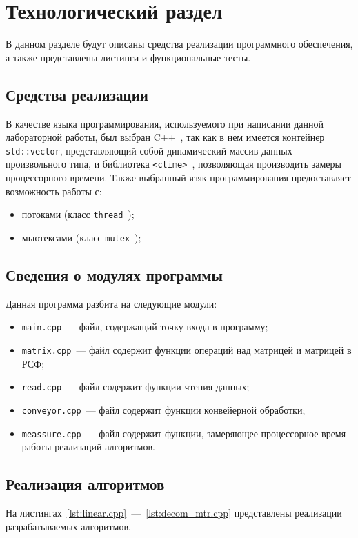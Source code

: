 \chapter{Технологический раздел}
В данном разделе будут описаны средства реализации программного обеспечения, а также представлены листинги и функциональные тесты.

\section{Средства реализации}
В качестве языка программирования, используемого при написании данной лабораторной работы, был выбран C++~\cite{cpp-lang}, так как в нем имеется контейнер \texttt{std::vector}, представляющий собой динамический массив данных произвольного типа, и библиотека \texttt{<ctime>}~\cite{cpp-ctime}, позволяющая производить замеры процессорного времени.
Также выбранный язяк программирования предоставляет возможность работы с:
\begin{itemize}
	\item потоками (класс \texttt{thread}~\cite{cpp-thread});
	\item мьютексами (класс \texttt{mutex}~\cite{cpp-mutex});
\end{itemize}

\section{Сведения о модулях программы}
Данная программа разбита на следующие модули:
\begin{itemize}
	\item \texttt{main.cpp}~--- файл, содержащий точку входа в программу;
	\item \texttt{matrix.cpp}~--- файл содержит функции операций над матрицей и матрицей в РСФ;
	\item \texttt{read.cpp}~--- файл содержит функции чтения данных;
	\item \texttt{conveyor.cpp}~--- файл содержит функции конвейерной обработки;
	\item \texttt{meassure.cpp}~--- файл содержит функции, замеряющее процессорное время работы реализаций алгоритмов.
\end{itemize}
	
\section{Реализация алгоритмов}
На листингах~\ref{lst:linear.cpp}~---~\ref{lst:decom_mtr.cpp} представлены реализации разрабатываемых алгоритмов.

